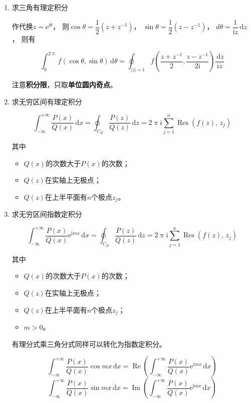 \documentclass[UTF8,fontset=fandol,zihao=5]{ctexart}
\newcommand{\ii}{\mathrm{i}}
\newcommand{\ee}{\mathrm{e}}
\newcommand{\dd}{\,\mathrm{d}}
\newcommand{\Res}{\operatorname{Res}}
\begin{document}
\begin{enumerate}
  \item 求三角有理定积分
  
  作代换$z=\ee^{\ii\theta}$，
  则$\cos\theta=\dfrac{1}{2}(z+z^{-1})$，
  $\sin\theta=\dfrac{1}{2}(z-z^{-1})$，
  $d\theta=\dfrac{1}{\ii z}\dd z$，
  则有

  \[
  \int_{0}^{2\uppi} f(\cos\theta,\sin\theta)\dd\theta = \oint_{|z|=1} f\left(\frac{z+z^{-1}}{2},\frac{z-z^{-1}}{2\ii}\right)\frac{\dd z}{\ii z}
  \]
  
  注意\textbf{积分限}，只取\textbf{单位圆内奇点}。

  \item 求无穷区间有理定积分
  
  \[
  \int_{-\infty}^{+\infty} \frac{P(x)}{Q(x)}\dd x = \oint_{C_R} \frac{P(z)}{Q(z)}\dd z = 2\uppi\ii\sum_{j=1}^{n}\Res(f(z),\,z_j)
  \]

  其中
  \begin{itemize}
    \item $Q(x)$的次数大于$P(x)$的次数；
    \item $Q(z)$在实轴上无极点；
    \item $Q(z)$在上半平面有$n$个极点$z_j$。
  \end{itemize}

  \item 求无穷区间指数定积分

  \[
  \int_{-\infty}^{+\infty} \frac{P(x)}{Q(x)}\ee^{\ii mx}\dd x = \oint_{C_R} \frac{P(z)}{Q(z)}\dd z = 2\uppi\ii\sum_{j=1}^{n}\Res(f(z),\,z_j)
  \]

  其中
  \begin{itemize}
    \item $Q(x)$的次数大于$P(x)$的次数；
    \item $Q(z)$在实轴上无极点；
    \item $Q(z)$在上半平面有$n$个极点$z_j$；
    \item $m>0$。
  \end{itemize}

  有理分式乘三角分式同样可以转化为指数定积分。

  \[
  \int_{-\infty}^{+\infty} \frac{P(x)}{Q(x)}\cos{mx}\dd x = \operatorname{Re} \left(\int_{-\infty}^{+\infty} \frac{P(x)}{Q(x)}\ee^{\ii mx}\dd x\right)
  \]
  \[
  \int_{-\infty}^{+\infty} \frac{P(x)}{Q(x)}\sin{mx}\dd x = \operatorname{Im} \left(\int_{-\infty}^{+\infty} \frac{P(x)}{Q(x)}\ee^{\ii mx}\dd x\right)
  \]

\end{enumerate}
\end{document}
